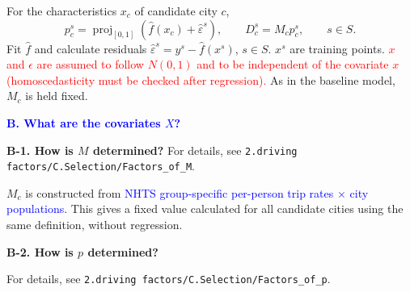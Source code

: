 \documentclass[10pt,a4paper]{article}
\newcommand{\proj}{\operatorname{proj}}
\begin{document}
For the characteristics $x_c$ of candidate city $c$,
{\color{blue}\[
p_c^s=\proj_{[0,1]}(\hat f(x_c)+\hat\varepsilon^s),\qquad D_c^s=M_cp_c^s,\qquad s\in S.
\]}
Fit $\hat f$ and calculate residuals $\hat\varepsilon^s=y^s-\hat f(x^s)$, $s\in S$. $x^s$ are training points. \textcolor{red}{$x$ and $\epsilon$ are assumed to follow $N(0,1)$ and to be independent of the covariate $x$ (homoscedasticity must be checked after regression).} As in the baseline model, $M_c$ is held fixed.

\textcolor{blue}{\textbf{B. What are the covariates $X$?}}

\textbf{B-1. How is $M$ determined?} For details, see \texttt{2.driving factors/C.Selection/Factors\_of\_M}.

$M_c$ is constructed from \textcolor{blue}{NHTS group-specific per-person trip rates $\times$ city populations}. This gives a fixed value calculated for all candidate cities using the same definition, without regression.

\textbf{B-2. How is $p$ determined?}

For details, see \texttt{2.driving factors/C.Selection/Factors\_of\_p}.
\end{document}
